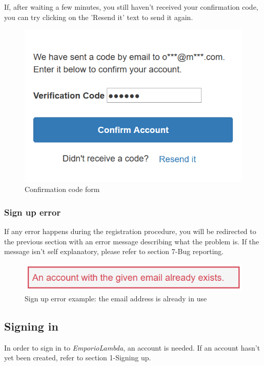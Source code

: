 If, after waiting a few minutes, you still haven't received your confirmation code, you can try clicking on the 'Resend it' text to send it again.

\begin{figure}[H]
\centering
\includegraphics[scale=0.6]{res/Immagini/RegisterCode}
\caption{Confirmation code form}
\end{figure}

\subsubsection{Sign up error}
If any error happens during the registration procedure, you will be redirected to the previous section with an error message describing what the problem is. If the message isn't self explanatory, please refer to section 7-Bug reporting.

\begin{figure}[H]
\centering
\includegraphics[scale=0.6]{res/Immagini/RegisterError}
\caption{Sign up error example: the email address is already in use}
\end{figure}

\subsection{Signing in}
In order to sign in to \textit{EmporioLambda}, an account is needed. If an account hasn't yet been created, refer to section 1-Signing up.


